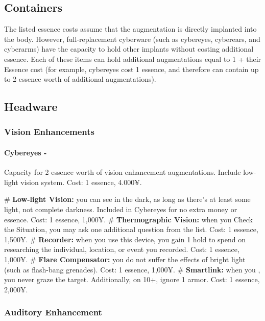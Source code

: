 \subsection{Containers}
The listed essence costs assume that the augmentation is directly implanted into the body. However, full-replacement cyberware (such as cybereyes, cyberears, and cyberarms) have the capacity to hold other implants without costing additional essence. Each of these items can hold additional augmentations equal to 1 + their Essence cost (for example, cybereyes cost 1 essence, and therefore can contain up to 2 essence worth of additional augmentations).


\subsection{Headware}

\subsubsection{Vision Enhancements}
\paragraph{Cybereyes -} Capacity for 2 essence worth of vision enhancement augmentations. Include low-light vision system. Cost: 1 essence, 4.000¥.

\begin{easylist}
    # \textbf{Low-light Vision:} you can see in the dark, as long as there’s at least some light, not complete darkness. Included in Cybereyes for no extra money or essence. Cost: 1 essence, 1,000¥.    
    # \textbf{Thermographic Vision:} when you Check the Situation, you may ask one additional question from the list. Cost: 1 essence, 1,500¥.    
    # \textbf{Recorder:} when you use this device, you gain 1 hold to spend on researching the individual, location, or event you recorded. Cost: 1 essence, 1,000¥.    
    # \textbf{Flare Compensator:} you do not suffer the effects of bright light (such as flash-bang grenades). Cost: 1 essence, 1,000¥.    
    # \textbf{Smartlink:} when you , you never graze the target. Additionally, on 10+, ignore 1 armor. Cost: 1 essence, 2,000¥.
\end{easylist}
    

\subsubsection{Auditory Enhancement}
